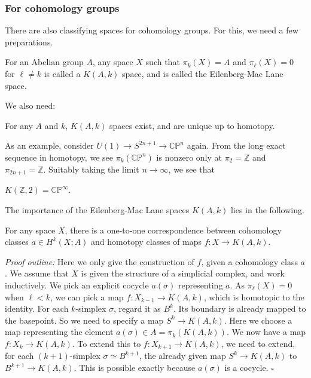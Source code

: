 \documentclass[12pt]{article}
\numberwithin{equation}{section}
\theoremstyle{remark}
\renewenvironment{proof}{\noindent\textsl{Proof outline:}}{\hfill$\square$}
\def\bZ{\mathbb{Z}}
\def\CP{\mathbb{CP}}
\begin{document}
\subsubsection{For cohomology groups}

There are also classifying spaces for cohomology groups.
For this, we need a few preparations.
\begin{definition}
For an Abelian group $A$,
any space $X$ such that $\pi_k(X)=A$ and $\pi_\ell(X)=0$ for $\ell\neq k$ is called a $K(A,k)$ space,
and is called the Eilenberg-Mac Lane space.
\end{definition}


We also need:
\begin{theorem}
For any $A$ and $k$,
$K(A,k)$ spaces exist, and are unique up to homotopy.
\end{theorem}

As an example, consider $U(1)\to S^{2n+1}\to \CP^n$ again.
From the long exact sequence in homotopy, we see $\pi_k(\CP^n)$ is nonzero only at $\pi_2=\bZ$ and $\pi_{2n+1}=\bZ$.
Suitably taking the limit $n\to \infty$,
we see that 
\begin{example}
$K(\bZ,2)=\CP^\infty$.
\end{example}

The importance of the Eilenberg-Mac Lane spaces $K(A,k)$ lies in the following.
\begin{theorem}
\label{thm:coh-cl}
For any space $X$, 
there is a one-to-one correspondence between cohomology classes $a \in H^k(X;A)$ 
and homotopy classes of maps $f: X\to K(A,k)$.
\end{theorem}
\begin{proof}
Here we only give the construction of $f$, given a cohomology class $a$.
We assume that $X$ is given the structure of a simplicial complex,
and work inductively.
We pick an explicit cocycle $a(\sigma)$ representing $a$.
As $\pi_{\ell}(X)=0$ when $\ell<k$,
we can pick a map $f:X_{k-1}\to K(A,k)$, which is homotopic to the identity.
For each $k$-simplex $\sigma$, regard it as $B^k$.
Its boundary is already mapped to the basepoint.
So we need to specify a map $S^k \to K(A,k)$.
Here we choose a map representing the element $a(\sigma)\in A=\pi_k(K(A,k))$. 
We now have a map $f:X_k \to K(A,k)$.
To extend this to $f:X_{k+1}\to K(A,k)$,
we need to extend, for each $(k+1)$-simplex $\sigma\simeq B^{k+1}$,
the already given map $S^k \to K(A,k)$
to $B^{k+1}\to K(A,k)$.
This is possible exactly because $a(\sigma)$ is a cocycle.
\end{proof}
\end{document}
